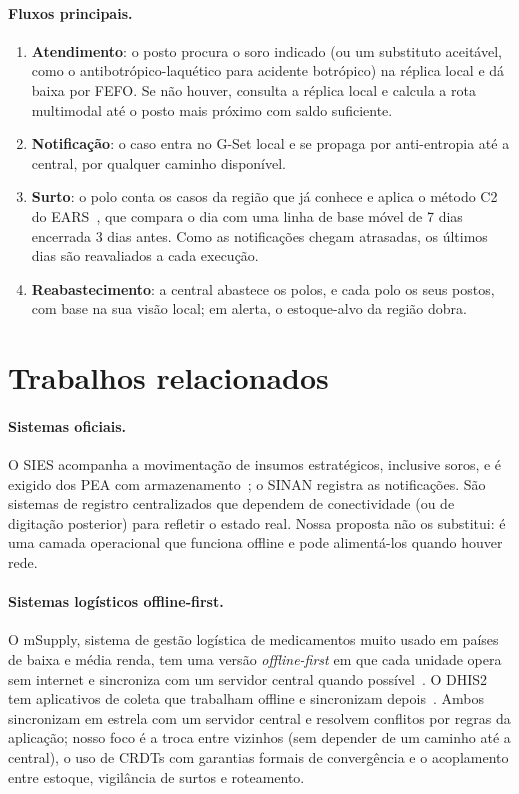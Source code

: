 \documentclass[a4paper,12pt]{article}
\begin{document}
\paragraph{Fluxos principais.}
\begin{enumerate}
  \item \textbf{Atendimento}: o posto procura o soro indicado (ou um substituto
        aceitável, como o antibotrópico-laquético para acidente botrópico) na
        réplica local e dá baixa por FEFO. Se não houver, consulta a réplica local
        e calcula a rota multimodal até o posto mais próximo com saldo suficiente.
  \item \textbf{Notificação}: o caso entra no G-Set local e se propaga por
        anti-entropia até a central, por qualquer caminho disponível.
  \item \textbf{Surto}: o polo conta os casos da região que já conhece e aplica o
        método C2 do EARS~\cite{hutwagner2003}, que compara o dia com uma linha de
        base móvel de 7 dias encerrada 3 dias antes. Como as notificações chegam
        atrasadas, os últimos dias são reavaliados a cada execução.
  \item \textbf{Reabastecimento}: a central abastece os polos, e cada polo os seus
        postos, com base na sua visão local; em alerta, o estoque-alvo da região
        dobra.
\end{enumerate}

\section{Trabalhos relacionados}
\label{sec:relacionados}

\paragraph{Sistemas oficiais.} O SIES acompanha a movimentação de insumos
estratégicos, inclusive soros, e é exigido dos PEA com
armazenamento~\cite{nt127}; o SINAN registra as notificações. São sistemas
de registro centralizados que dependem de conectividade (ou de digitação
posterior) para refletir o estado real. Nossa proposta não os substitui: é
uma camada operacional que funciona offline e pode alimentá-los quando houver
rede.

\paragraph{Sistemas logísticos offline-first.} O mSupply, sistema de
gestão logística de medicamentos muito usado em países de baixa e média
renda, tem uma versão \emph{offline-first} em que cada unidade opera sem
internet e sincroniza com um servidor central quando possível~\cite{msupply}.
O DHIS2 tem aplicativos de coleta que trabalham offline e sincronizam
depois~\cite{dhis2}. Ambos sincronizam em estrela com um servidor central e
resolvem conflitos por regras da aplicação; nosso foco é a troca entre
vizinhos (sem depender de um caminho até a central), o uso de CRDTs com
garantias formais de convergência e o acoplamento entre estoque, vigilância
de surtos e roteamento.
\end{document}
